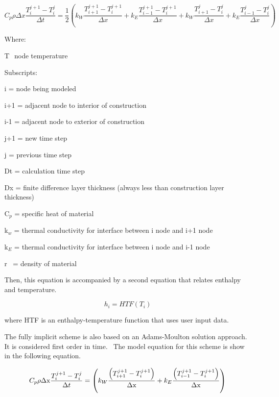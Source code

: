 \begin{equation}
C_p \rho \Delta x \frac{T_i^{j+1}-T_i^j}{\Delta t} = 
     \frac{1}{2}\left(k_W\frac{T_{i+1}^{j+1}-T_{i}^{j+1}}{\Delta x} +
                      k_E\frac{T_{i-1}^{j+1}-T_{i}^{j+1}}{\Delta x} + 
                      k_W\frac{T_{i+1}^{j}-T_{i}^{j}}{\Delta x} +
                      k_E\frac{T_{i-1}^{j}-T_{i}^{j}}{\Delta x}\right)
\end{equation}

Where:

T \(_{}\) node temperature

Subscripts:

i = node being modeled

i+1 = adjacent node to interior of construction

i-1 = adjacent node to exterior of construction

j+1 = new time step

j = previous time step

Dt = calculation time step

Dx = finite difference layer thickness (always less than construction layer thickness)

C\(_{p}\) = specific heat of material

k\(_{w}\) = thermal conductivity for interface between i node and i+1 node

k\(_{E}\) = thermal conductivity for interface between i node and i-1 node

r~ = density of material

Then, this equation is accompanied by a second equation that relates enthalpy and temperature.

\begin{equation}
{h_i} = HTF\left( {{T_i}} \right)
\end{equation}

where HTF is an enthalpy-temperature function that uses user input data.

The fully implicit scheme is also based on an Adams-Moulton solution approach. It is considered first order in time.~ The model equation for this scheme is show in the following equation.

\begin{equation}
{C_p}\rho {\rm{\Delta x}}\frac{{T_i^{j + 1} - T_i^j}}{{{\rm{\Delta }}t}} = \left( {{k_W}\frac{{\left( {T_{i + 1}^{j + 1} - T_i^{j + 1}} \right)}}{{{\rm{\Delta x}}}} + {k_E}\frac{{\left( {T_{i - 1}^{j + 1} - T_i^{j + 1}} \right)}}{{{\rm{\Delta x}}}}} \right)
\end{equation}

